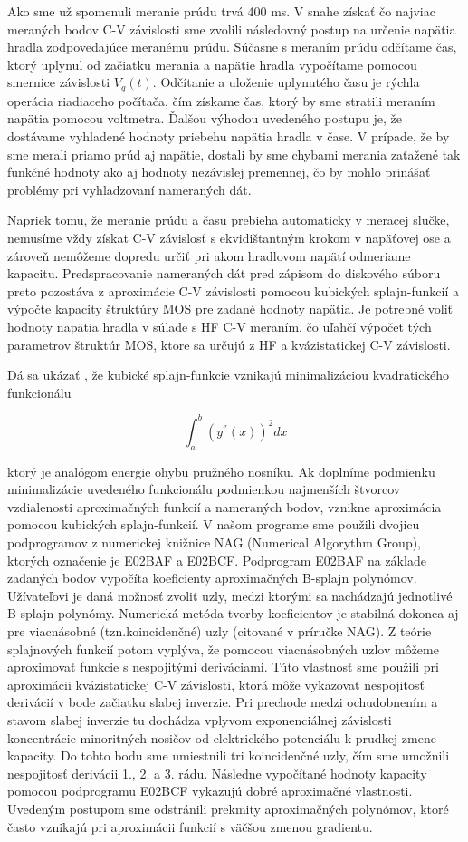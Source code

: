 Ako sme už spomenuli meranie prúdu trvá 400 ms.  V snahe získať čo
najviac meraných bodov C-V závislosti sme zvolili následovný postup na
určenie napätia hradla zodpovedajúce meranému prúdu. Súčasne s meraním
prúdu odčítame čas, ktorý uplynul od začiatku merania a napätie hradla
vypočítame pomocou smernice závislosti $V_{g}(t)$. Odčítanie a
uloženie uplynutého času je rýchla operácia riadiaceho počítača, čím
získame čas, ktorý by sme stratili meraním napätia pomocou
voltmetra. Ďalšou výhodou uvedeného postupu je, že dostávame vyhladené
hodnoty priebehu napätia hradla v čase. V prípade, že by sme merali
priamo prúd aj napätie, dostali by sme chybami merania zaťažené tak
funkčné hodnoty ako aj hodnoty nezávislej premennej, čo by mohlo
prinášať problémy pri vyhladzovaní nameraných dát.

Napriek tomu, že meranie prúdu a času prebieha automaticky v meracej
slučke, nemusíme vždy získat C-V závislosť s ekvidištantným krokom v
napäťovej ose a zároveň nemôžeme dopredu určiť pri akom hradlovom
napätí odmeriame kapacitu.  Predspracovanie nameraných dát pred
zápisom do diskového súboru preto pozostáva z aproximácie C-V
závislosti pomocou kubických splajn-funkcií a výpočte kapacity
štruktúry MOS pre zadané hodnoty napätia. Je potrebné voliť hodnoty
napätia hradla v súlade s HF C-V meraním, čo uľahčí výpočet tých
parametrov štruktúr MOS, ktore sa určujú z HF a kvázistatickej C-V
závislosti.

Dá sa ukázať \cite{5.4}, že kubické splajn-funkcie vznikajú
minimalizáciou kvadratického funkcionálu

$$\int_{a}^{b}(y^{''}(x))^{2}dx$$                     

ktorý je analógom energie ohybu pružného nosníku.  Ak doplníme
podmienku minimalizácie uvedeného funkcionálu podmienkou najmenších
štvorcov vzdialenosti aproximačných funkcií a nameraných bodov,
vznikne aproximácia pomocou kubických splajn-funkcií. V našom programe
sme použili dvojicu podprogramov z numerickej knižnice NAG (Numerical
Algorythm Group), ktorých označenie je E02BAF a E02BCF. Podprogram
E02BAF na základe zadaných bodov vypočíta koeficienty aproximačných
B-splajn polynómov.  Užívateľovi je daná možnosť zvoliť uzly, medzi
ktorými sa nachádzajú jednotlivé B-splajn polynómy. Numerická metóda
tvorby koeficientov je stabilná dokonca aj pre viacnásobné
(tzn.koincidenčné) uzly \cite{5.5, 5.6} (citované v príručke NAG). Z
teórie splajnových funkcií potom vyplýva, že pomocou viacnásobných
uzlov môžeme aproximovať funkcie s nespojitými deriváciami. Túto
vlastnosť sme použili pri aproximácii kvázistatickej C-V závislosti,
ktorá môže vykazovať nespojitosť derivácií v bode začiatku slabej
inverzie. Pri prechode medzi ochudobnením a stavom slabej inverzie tu
dochádza vplyvom exponenciálnej závislosti koncentrácie minoritných
nosičov od elektrického potenciálu k prudkej zmene kapacity. Do tohto
bodu sme umiestnili tri koincidenčné uzly, čím sme umožnili
nespojitosť derivácii 1., 2. a 3. rádu. Následne vypočítané hodnoty
kapacity pomocou podprogramu E02BCF vykazujú dobré aproximačné
vlastnosti. Uvedeným postupom sme odstránili prekmity aproximačných
polynómov, ktoré často vznikajú pri aproximácii funkcií s väčšou
zmenou gradientu.

